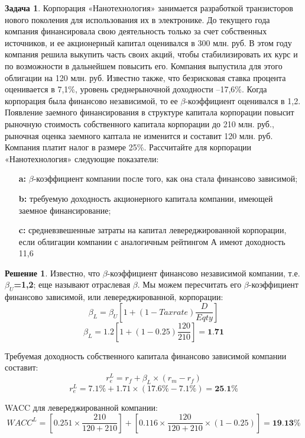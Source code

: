 \documentclass[a4paper, 14pt]{article}
\theoremstyle{plain} %
\theoremstyle{definition} %
\newtheorem*{solution}{Решение}
\newtheorem{problem}{Задача}[subsection]
\theoremstyle{remark} %
\begin{document}
\begin{problem}
	Корпорация  «Нанотехнология»  занимается  разработкой  транзисторов  нового поколения для использования их в электронике. До текущего года компания финансировала свою деятельность только за счет собственных источников, и ее акционерный капитал оценивался в 300 млн. руб. В этом году компания решила выкупить часть своих акций, чтобы стабилизировать их курс и по возможности в дальнейшем повысить его. Компания выпустила для этого облигации на 120 млн. руб. Известно также, что безрисковая ставка процента  оценивается  в  7,1\%,  уровень  среднерыночной  доходности –17,6\%.  Когда корпорация  была  финансово  независимой,  то  ее $\beta$-коэффициент  оценивался  в  1,2. Появление заемного финансирования в структуре капитала корпорации повысит рыночную стоимость собственного капитала корпорации до 210 млн. руб., рыночная оценка заемного каптала не изменится и составит 120 млн. руб. Компания  платит  налог  в  размере  25\%. Рассчитайте  для  корпорации «Нанотехнология» следующие показатели:
	\begin{itemize}
		\item[\textbf{a:}] $\beta$-коэффициент компании после того, как она стала финансово зависимой;
		\item[\textbf{b:}] требуемую доходность  акционерного  капитала  компании,  имеющей  заемное финансирование;
		\item[\textbf{c:}] средневзвешенные затраты на капитал левереджированной корпорации, если облигации компании с аналогичным рейтингом А имеют доходность 11,6%
	\end{itemize}
	\begin{solution}
		Известно, что $\beta$-коэффициент финансово независимой компании, т.е. \textbf{$\beta_{U}$=1,2}; еще называют отраслевая $\beta$. Мы можем пересчитать его $\beta$-коэффициент финансово зависимой, или левереджированной, корпорации:
		\[\beta_{L} = \beta_{U}\left[1 + (1-Taxrate)\frac{D}{Eqty}\right]\]
		\[\beta_{L} = 1.2\left[1 + (1-0.25)\frac{120}{210}\right] = \textbf{1.71}\]

		Требуемая доходность собственного капитала финансово зависимой компании составит:
		\[r_{e}^{L} = r_{f} + \beta_{L}\times(r_{m} - r_{f})\]
		\[r_{e}^{L} = 7.1\% + 1.71\times(17.6\% - 7.1\%) = \textbf{25.1\%}\]

		WACC для левереджированной компании:
		\[WACC^{L} = \left[0.251\times \frac{210}{120 + 210}\right] + \left[0.116 \times \frac{120}{120+210} \times (1-0.25)\right] = \textbf{19.13\%}\]
	\end{solution}
\end{problem}
\end{document}
